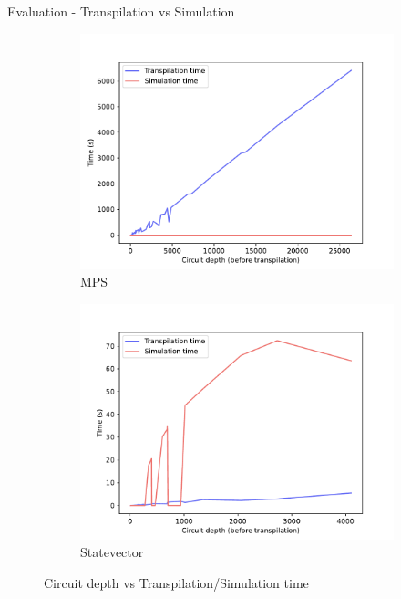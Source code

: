 \documentclass[10pt]{beamer}
\begin{document}
\begin{frame}{Evaluation - Transpilation vs Simulation}
  \begin{figure}
    \begin{subfigure}{0.48\textwidth}
      \centering
      \includegraphics[width=1.1\textwidth]{
          ../results/figures/circuit_depth_v_tran_time_and_sim_time-MPS.pdf
      }
      \caption{MPS}
      \label{fig:circuit_depth_v_tran_time_and_sim_time-MPS}
    \end{subfigure}
    \begin{subfigure}{0.48\textwidth}
      \centering
      \includegraphics[width=1.1\textwidth]{
          ../results/figures/circuit_depth_v_tran_time_and_sim_time-statevector_cpu.pdf
      }
      \caption{Statevector}
      \label{fig:circuit_depth_v_tran_time_and_sim_time-statevector_cpu}
    \end{subfigure}
    \caption{Circuit depth vs Transpilation/Simulation time}
  \end{figure}
\end{frame}
\end{document}
